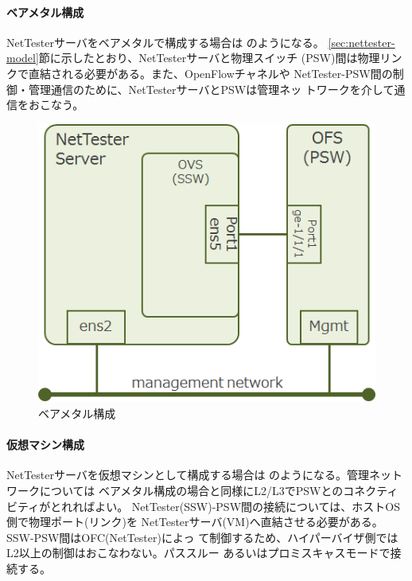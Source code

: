 \paragraph{ベアメタル構成}
NetTesterサーバをベアメタルで構成する場合は
のようになる。
\ref{sec:nettester-model}節に示したとおり、NetTesterサーバと物理スイッチ
(PSW)間は物理リンクで直結される必要がある。また、OpenFlowチャネルや
NetTester-PSW間の制御・管理通信のために、NetTesterサーバとPSWは管理ネッ
トワークを介して通信をおこなう。
\begin{figure}[h]
 \centering
 \includegraphics[scale=0.6]{img/nettester-deploy-baremetal.png}
 \caption{ベアメタル構成}
 \label{fig:nettester-deploy-baremetal}
\end{figure}

\paragraph{仮想マシン構成}
NetTesterサーバを仮想マシンとして構成する場合は
のようになる。管理ネットワークについては
ベアメタル構成の場合と同様にL2/L3でPSWとのコネクティビティがとれればよい。
NetTester(SSW)-PSW間の接続については、ホストOS側で物理ポート(リンク)を
NetTesterサーバ(VM)へ直結させる必要がある。SSW-PSW間はOFC(NetTester)によっ
て制御するため、ハイパーバイザ側ではL2以上の制御はおこなわない。パススルー
あるいはプロミスキャスモードで接続する。

